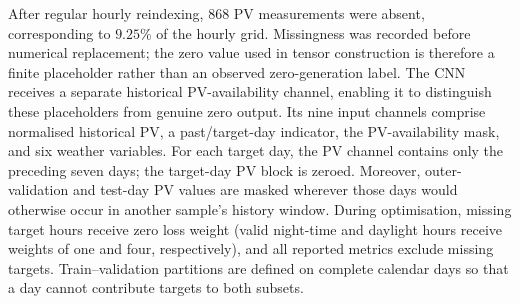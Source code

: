 
After regular hourly reindexing, 868 PV measurements were absent, corresponding
to $9.25\%$ of the hourly grid. Missingness was recorded before numerical
replacement; the zero value used in tensor construction is therefore a finite
placeholder rather than an observed zero-generation label. The CNN receives a
separate historical PV-availability channel, enabling it to distinguish these
placeholders from genuine zero output. Its nine input channels comprise
normalised historical PV, a past/target-day indicator, the PV-availability
mask, and six weather variables. For each target day, the PV channel contains
only the preceding seven days; the target-day PV block is zeroed. Moreover,
outer-validation and test-day PV values are masked wherever those days would
otherwise occur in another sample's history window. During optimisation,
missing target hours receive zero loss weight (valid night-time and daylight
hours receive weights of one and four, respectively), and all reported metrics
exclude missing targets. Train--validation partitions are defined on complete
calendar days so that a day cannot contribute targets to both subsets.

